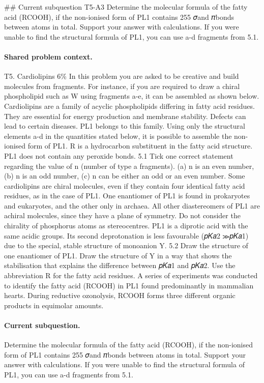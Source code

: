 \#\# Current subquestion T5-A3
Determine the molecular formula of the fatty acid (RCOOH), if the non-ionised form of PL1 contains 255 𝜎and 𝜋bonds between atoms in total. Support your answer with calculations. If you were unable to find the structural formula of PL1, you can use a-d fragments from 5.1.

\paragraph{Shared problem context.}
T5. Cardiolipins 6\% In this problem you are asked to be creative and build molecules from fragments. For instance, if you are required to draw a chiral phospholipid such as W using fragments a-e, it can be assembled as shown below. Cardiolipins are a family of acyclic phospholipids differing in fatty acid residues. They are essential for energy production and membrane stability. Defects can lead to certain diseases. PL1 belongs to this family. Using only the structural elements a-d in the quantities stated below, it is possible to assemble the non-ionised form of PL1. R is a hydrocarbon substituent in the fatty acid structure. PL1 does not contain any peroxide bonds. 5.1 Tick one correct statement regarding the value of n (number of type a fragments). (a) n is an even number, (b) n is an odd number, (c) n can be either an odd or an even number. Some cardiolipins are chiral molecules, even if they contain four identical fatty acid residues, as in the case of PL1. One enantiomer of PL1 is found in prokaryotes and eukaryotes, and the other only in archaea. All other diastereomers of PL1 are achiral molecules, since they have a plane of symmetry. Do not consider the chirality of phosphorus atoms as stereocentres. PL1 is a diprotic acid with the same acidic groups. Its second deprotonation is less favourable (𝑝𝐾𝑎2 ≫𝑝𝐾𝑎1) due to the special, stable structure of monoanion Y. 5.2 Draw the structure of one enantiomer of PL1. Draw the structure of Y in a way that shows the stabilisation that explains the difference between 𝑝𝐾𝑎1 and 𝑝𝐾𝑎2. Use the abbreviation R for the fatty acid residues. A series of experiments was conducted to identify the fatty acid (RCOOH) in PL1 found predominantly in mammalian hearts. During reductive ozonolysis, RCOOH forms three different organic products in equimolar amounts.

\paragraph{Current subquestion.}
Determine the molecular formula of the fatty acid (RCOOH), if the non-ionised form of PL1 contains 255 𝜎and 𝜋bonds between atoms in total. Support your answer with calculations. If you were unable to find the structural formula of PL1, you can use a-d fragments from 5.1.

